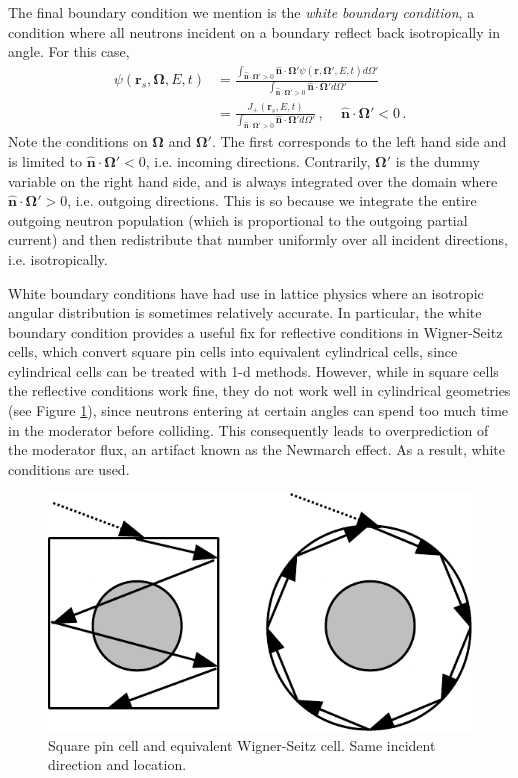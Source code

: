 The final boundary condition we mention is the \textit{white boundary condition}, a condition where all neutrons incident on a boundary reflect back isotropically in angle.  For this case,
\begin{equation}
\begin{split}
 \psi(\mathbf{r}_s,\mathbf{\Omega},E,t) &= \frac{ \int_{\mathbf{\hat{n}} \cdot \mathbf{\Omega}' > 0}   \mathbf{\hat{n}} \cdot \mathbf{\Omega}' \psi (\mathbf{r},\mathbf{\Omega}',E,t)d\Omega' } {  \int_{\mathbf{\hat{n}} \cdot \mathbf{\Omega}' > 0}  \mathbf{\hat{n}} \cdot \mathbf{\Omega}'  d\Omega'    }  \\
             &= \frac{ J_+ (\mathbf{r}_s,E,t) } {  \int_{\mathbf{\hat{n}} \cdot \mathbf{\Omega}' > 0}  \mathbf{\hat{n}} \cdot \mathbf{\Omega}'  d\Omega'    }\, , \, \, \, \,  \, \, \, \mathbf{\hat{n}} \cdot \mathbf{\Omega}' < 0 \, .
\end{split}
\end{equation}
Note the conditions on $\mathbf{\Omega}$ and $\mathbf{\Omega}'$.  The first corresponds to the left hand side and is limited to $\mathbf{\hat{n}} \cdot \mathbf{\Omega}' < 0$, i.e. incoming directions.  Contrarily, $\mathbf{\Omega}'$ is the dummy variable on the right hand side, and is always integrated over the domain where $\mathbf{\hat{n}} \cdot \mathbf{\Omega}' > 0$, i.e. outgoing directions.  This is so because we integrate the entire outgoing neutron population (which is proportional to the outgoing partial current) and then redistribute that number uniformly over all incident directions, i.e. isotropically.

White boundary conditions have had use in lattice physics where an isotropic angular distribution is sometimes relatively accurate.  In particular, the white boundary condition provides a useful fix for reflective conditions in Wigner-Seitz cells, which convert square pin cells into equivalent cylindrical cells, since cylindrical cells can be treated with 1-d methods.  However, while in square cells the reflective conditions work fine, they do not work well in cylindrical geometries (see Figure \ref{fig:wignerseitz}), since neutrons entering at certain angles can spend too much time in the moderator before colliding.  This consequently leads to overprediction of the moderator flux, an artifact known as the Newmarch effect. As a result, white conditions are used.


\begin{figure}[h] 
    \centering
    \includegraphics[keepaspectratio, width = 3.0 in]{images/wignerseitz}
    \caption{Square pin cell and equivalent Wigner-Seitz cell.  Same incident direction and location.}
    \label{fig:wignerseitz}
\end{figure}


